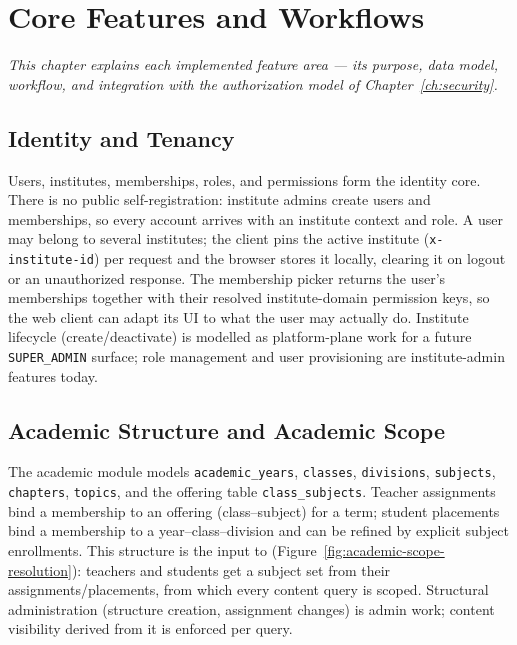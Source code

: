\chapter{Core Features and Workflows}
\label{ch:features}

\begin{center}
\textit{This chapter explains each implemented feature area --- its purpose,
data model, workflow, and integration with the authorization model of
Chapter~\ref{ch:security}.}
\end{center}

\vspace*{\fill}
\clearpage
\section{Identity and Tenancy}

Users, institutes, memberships, roles, and permissions form the identity core.
There is no public self-registration: institute admins create users and
memberships, so every account arrives with an institute context and role. A
user may belong to several institutes; the client pins the active institute
(\texttt{x-institute-id}) per request and the browser stores it locally,
clearing it on logout or an unauthorized response. The membership picker
returns the user's memberships together with their resolved institute-domain
permission keys, so the web client can adapt its UI to what the user may
actually do. Institute lifecycle (create/deactivate) is modelled as
platform-plane work for a future \texttt{SUPER\_ADMIN} surface; role
management and user provisioning are institute-admin features today.

\section{Academic Structure and Academic Scope}

The academic module models \texttt{academic\_years}, \texttt{classes},
\texttt{divisions}, \texttt{subjects}, \texttt{chapters}, \texttt{topics}, and
the offering table \texttt{class\_subjects}. Teacher assignments bind a
membership to an offering (class--subject) for a term; student placements bind
a membership to a year--class--division and can be refined by explicit subject
enrollments. This structure is the input to
\texttt{}
(Figure~\ref{fig:academic-scope-resolution}): teachers and students get a
subject set
from their assignments/placements, from which every content query is scoped.
Structural administration (structure creation, assignment changes) is admin
work; content visibility derived from it is enforced per query.

